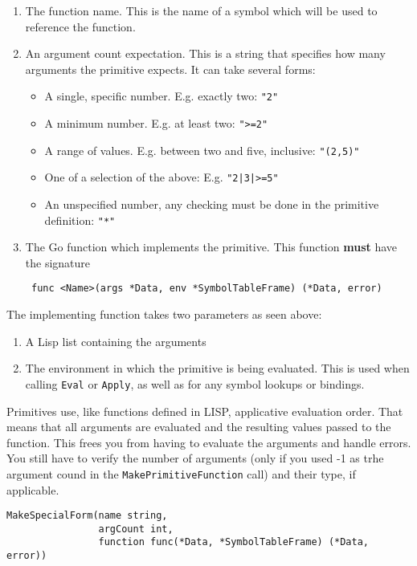 \documentclass{article}
\begin{document}
\begin{enumerate}
\item The function name. This is the name of a symbol which will be used to reference the
  function.
\item An argument count expectation. This is a string that specifies how many arguments the
  primitive expects. It can take several forms:
  \begin{itemize}
  \item A single, specific number. E.g. exactly two: \verb|"2"|
  \item A minimum number. E.g. at least two: \verb|">=2"|
  \item A range of values. E.g. between two and five, inclusive: \verb|"(2,5)"|
  \item One of a selection of the above: E.g.
    \verb?"2|3|>=5"?
  \item An unspecified number, any checking must be done in the primitive definition:
    \verb|"*"|
  \end{itemize}
\item The Go function which implements the primitive. This function \textbf{must} have the
  signature
\begin{verbatim}
 func <Name>(args *Data, env *SymbolTableFrame) (*Data, error)
\end{verbatim}
\end{enumerate}

The implementing function takes two parameters as seen above:

\begin{enumerate}
\item A Lisp list containing the arguments
\item The environment in which the primitive is being evaluated. This is used when calling
  \verb|Eval| or \verb|Apply|, as well as for any symbol lookups or bindings.
\end{enumerate}

Primitives use, like functions defined in LISP, applicative evaluation order. That means that
all arguments are evaluated and the resulting values passed to the function. This frees you
from having to evaluate the arguments and handle errors. You still have to verify the number
of arguments (only if you used -1 as trhe argument cound in the \verb|MakePrimitiveFunction|
call) and their type, if applicable.

\begin{verbatim}
MakeSpecialForm(name string,
                argCount int,
                function func(*Data, *SymbolTableFrame) (*Data, error))
\end{verbatim}
\end{document}
